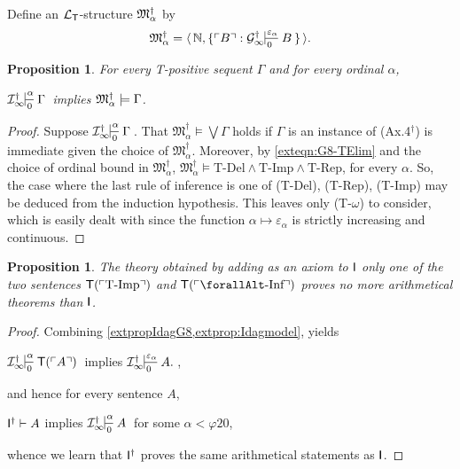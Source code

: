 \documentclass[UKenglish,cleveref,DIV=12]{scrartcl}
\let\forall\forallAlt
\newtheorem{proposition}[lemma]{Proposition}
\theoremstyle{definition}
\theoremstyle{definition}
\begin{document}
Define an $\mathcal{L}_{\mathsf{T}}$-structure $\mathfrak{M}_\alpha^\dag$ by
\begin{align*}
 \struc M^\dag_\alpha=\pair{\N,\{\gn B: \Ginfty^\dag\prov{\varepsilon_\alpha}0B\}}.
\end{align*}
\begin{proposition}\label{extprop:Idagmodel} For every T-positive sequent $\Gamma$ and for every ordinal $\alpha$,
\begin{center}
 $\Iinfty^\dag\prov\alpha0\Gamma$ implies $\mathfrak{M}^\dag_\alpha\models\Gamma$.
\end{center}
\end{proposition}
\begin{proof} Suppose $\Iinfty^\dag\prov\alpha0\Gamma$. That $\mathfrak{M}^\dag_\alpha\models\bigvee\Gamma$ holds if $\Gamma$ is an instance of (Ax.4$^\dag$) is immediate given the choice of $\mathfrak{M}^\dag_\alpha$. Moreover, by
\cref{exteqn:G8-TElim} and the choice of ordinal bound in $\mathfrak{M}^\dag_\alpha$, $\mathfrak{M}^\dag_\alpha\models\text{T-Del}\land\text{T-Imp}\land\text{T-Rep}$, for every $\alpha$. So, the case where the last rule of inference is one of
(T-Del), (T-Rep), (T-Imp) may be deduced from the induction hypothesis. This
leaves only (T-$\omega$) to consider, which is easily dealt with since the
function $\alpha\mapsto\varepsilon_\alpha$ is strictly increasing and continuous.
\end{proof}
\begin{proposition}\label{extthm:Iconserve}
  The theory obtained by adding as an axiom to $\mathsf{I}$ only one of the two
  sentences $\mathsf{T}(\ulcorner{\text{T-Imp}}\urcorner)$ and $\T(\gn{\text{$\forall$-Inf}})$ proves no more
  arithmetical theorems than $\mathsf{I}$.
\end{proposition}
\begin{proof}
Combining \cref{extpropIdagG8,extprop:Idagmodel}, yields
\begin{center}
 $\Iinfty^\dag\prov\alpha0{\T(\gn{A})}$ implies	$\Iinfty^\dag\prov{\varepsilon_\alpha}0{A.}$,
\end{center}
 and hence for every sentence $A$,
\begin{center}
  $\mathsf{I}^\dag\vdash A$ implies $\Iinfty^\dag\prov\alpha0A$ for some $\alpha<\varphi20$,
\end{center}
whence we learn that $\mathsf{I}^\dag$ proves the same arithmetical statements as $\mathsf{I}$.
 \end{proof}
\end{document}
